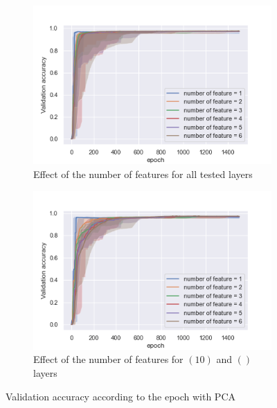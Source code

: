 \documentclass[twocolumn, 10pt]{article}
\begin{document}
			\begin{figure}[h]
				\centering
				\begin{subfigure}[t]{0.7\columnwidth}
					\centering
					\includegraphics[width=\linewidth]{../graphics/PCA_epoch_val_categorical_accuracy_number_of_feature.png}
					\caption{Effect of the number of features for all tested layers}
					\label{fig:per_pca_nf}
				\end{subfigure}
				\begin{subfigure}[t]{0.7\columnwidth}
					\centering
					\includegraphics[width=\linewidth]{../graphics/PCA_epoch_val_categorical_accuracy_number_of_feature_10_.png}
					\caption{Effect of the number of features for $(10)$ and $()$ layers}
					\label{fig:per_pca_nf_3525}
				\end{subfigure}
				\caption{Validation accuracy according to the epoch with PCA}
				\label{fig:per_pca}
			\end{figure}
\end{document}
